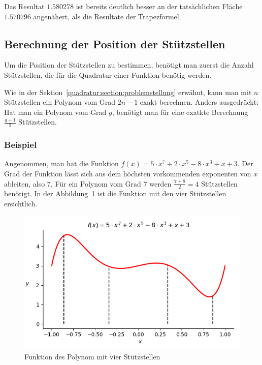 \noindent
Das Resultat $1.580278$ ist bereits deutlich besser an der tatsächlichen Fläche $1.570796$ 
angenähert, als die Resultate der Trapezformel. 

\subsection{Berechnung der Position der Stützstellen
\label{quadratur:subsection:stützstellenberechnung}}
Um die Position der Stützstellen zu bestimmen, benötigt man zuerst die Anzahl Stützstellen, 
die für die Quadratur einer Funktion benötig werden.

Wie in der Sektion~\ref{quadratur:section:problemstellung} erwähnt, 
kann man mit $n$ Stützstellen ein Polynom vom Grad $2n-1$ exakt berechnen.
Anders ausgedrückt: Hat man ein Polynom vom Grad $g$, 
benötigt man für eine exatkte Berechnung $\frac{g+1}{2}$ Stützstellen.

\subsubsection{Beispiel}
Angenommen, man hat die Funktion $f(x) = 5 \cdot x^{7} + 2 \cdot x^{5} - 8 \cdot x^{3} + x + 3$.
Der Grad der Funktion lässt sich aus dem höchsten vorkommenden exponenten von $x$ ableiten,
also $7$.
Für ein Polynom vom Grad $7$ werden $\frac{7+8}{2} = 4$ Stützstellen benötigt.
In der Abbildung~\ref{quadratur:figure:polynom} ist die Funktion mit den vier Stützstellen ersichtlich.

\begin{figure}[!h]
    \centering
    \includegraphics[scale=0.5]{papers/quadratur/figures/polynom.png}
    \caption{ Funktion des Polynom mit vier Stützstellen
    \label{quadratur:figure:polynom}}
\end{figure}

